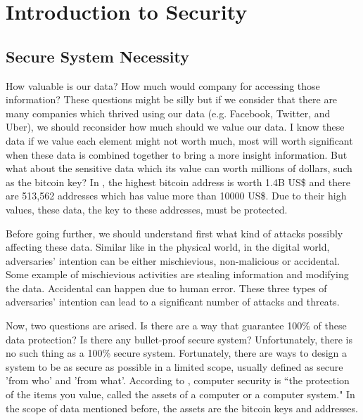 \chapter{Introduction to Security}

\section{Secure System Necessity}
How valuable is our data? How much would company for accessing those information? These questions might be silly but if we consider that there are many companies which thrived using our data (e.g. Facebook, Twitter, and Uber), we should reconsider how much should we value our data. I know these data if we value each element might not worth much, most will worth significant when these data is combined together to bring a more insight information. But what about the sensitive data which its value can worth millions of dollars, such as the bitcoin key? In \cite{bitcoin}, the highest bitcoin address is worth 1.4B US\$ and there are 513,562 addresses which has value more than 10000 US\$. Due to their high values, these data, the key to these addresses, must be protected.

Before going further, we should understand first what kind of attacks possibly affecting these data. Similar like in the physical world, in the digital world, adversaries' intention can be either mischievious, non-malicious or accidental. Some example of mischievious activities are stealing information and modifying the data. Accidental can happen due to human error. These three types of adversaries' intention can lead to a significant number of attacks and threats.

Now, two questions are arised. Is there are a way that guarantee 100\% of these data protection? Is there any bullet-proof secure system? Unfortunately, there is no such thing as a 100\% secure system. Fortunately, there are ways to design a system to be as secure as possible in a limited scope, usually defined as secure 'from who' and 'from what'. According to \cite{Pfleeger}, computer security is ``the protection of the items you value, called the assets of a computer or a computer system." In the scope of data mentioned before, the assets are the bitcoin keys and addresses.

